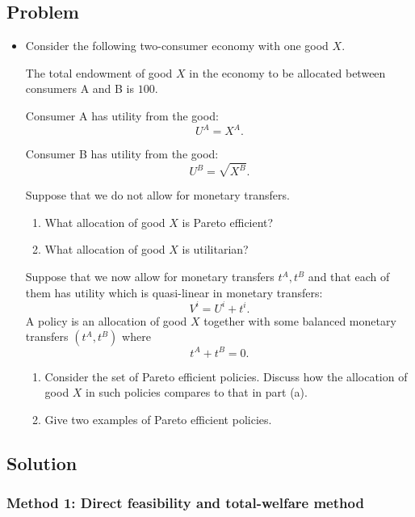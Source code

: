 \documentclass[12pt]{article}
\begin{document}
\subsection{Problem}
\begin{itemize}
    \item Consider the following two-consumer economy with one good \(X\).

    The total endowment of good \(X\) in the economy to be allocated between consumers A and B is \(100\).

    Consumer A has utility from the good:
    \[
    U^A=X^A.
    \]

    Consumer B has utility from the good:
    \[
    U^B=\sqrt{X^B}.
    \]

    Suppose that we do not allow for monetary transfers.

    \begin{enumerate}[label=(\alph*)]
        \item What allocation of good \(X\) is Pareto efficient?
        \item What allocation of good \(X\) is utilitarian?
    \end{enumerate}

    Suppose that we now allow for monetary transfers \(t^A,t^B\) and that each of them has utility which is quasi-linear in monetary transfers:
    \[
    V^i=U^i+t^i.
    \]
    A policy is an allocation of good \(X\) together with some balanced monetary transfers \((t^A,t^B)\) where
    \[
    t^A+t^B=0.
    \]

    \begin{enumerate}[label=(\alph*),resume]
        \item Consider the set of Pareto efficient policies. Discuss how the allocation of good \(X\) in such policies compares to that in part (a).
        \item Give two examples of Pareto efficient policies.
    \end{enumerate}
\end{itemize}

\newpage
\subsection{Solution}

\subsubsection{Method 1: Direct feasibility and total-welfare method}
\end{document}
